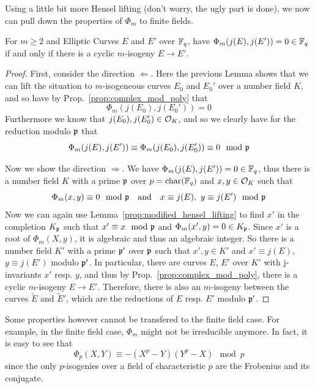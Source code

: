 Using a little bit more Hensel lifting (don't worry, the ugly part is done), we now can pull down the properties of $\Phi_m$ to finite fields.
\begin{prop}
    For $m \geq 2$ and Elliptic Curves $E$ and $E'$ over $\mathbb{F}_q$, have $\Phi_m(j(E), j(E')) = 0 \in \mathbb{F}_q$ if and only if there is a cyclic $m$-isogeny $E \to E'$.
\end{prop}
\begin{proof}
    First, consider the direction $\Leftarrow$.
    Here the previous Lemma shows that we can lift the situation to $m$-isogeneous curves $E_0$ and $E_0'$ over a number field $K$, and so have by Prop.~\ref{prop:complex_mod_poly} that
    \begin{equation*}
        \Phi_m(j(E_0), j(E_0')) = 0
    \end{equation*}
    Furthermore we know that $j(E_0), j(E_0') \in \mathcal{O}_K$, and so we clearly have for the reduction modulo $\mathfrak{p}$ that
    \begin{equation*}
        \Phi_m(j(E), j(E')) \equiv \Phi_m(j(E_0), j(E_0')) \equiv 0 \mod {\mathfrak{p}}
    \end{equation*}

    Now we show the direction $\Rightarrow$.
    We have $\Phi_m(j(E), j(E')) = 0 \in \mathbb{F}_q$, thus there is a number field $K$ with a prime $\mathfrak{p}$ over $p = \mathrm{char}(\mathbb{F}_q)$ and $x, y \in \mathcal{O}_K$ such that
    \begin{equation*}
        \Phi_m(x, y) \equiv 0 \mod {\mathfrak{p}} \quad \text{and} \quad x \equiv j(E), \ y \equiv j(E') \mod {\mathfrak{p}}
    \end{equation*}
    Now we can again use Lemma~\ref{prop:modified_hensel_lifting} to find $x'$ in the completion $K_{\mathfrak{p}}$ such that $x' \equiv x \mod {\mathfrak{p}}$ and $\Phi_m(x', y) = 0 \in K_{\mathfrak{p}}$.
    Since $x'$ is a root of $\Phi_m(X, y)$, it is algebraic and thus an algebraic integer.
    So there is a number field $K'$ with a prime $\mathfrak{p}'$ over $\mathfrak{p}$ such that $x', y \in K'$ and $x' \equiv j(E)$, $y \equiv j(E')$ modulo $\mathfrak{p}'$.
    In particular, there are curves $E$, $E'$ over $K'$ with j-invariants $x'$ resp. $y$, and thus by Prop.~\ref{prop:complex_mod_poly}, there is a cyclic $m$-isogeny $E \to E'$.
    Therefore, there is also an $m$-isogeny between the curves $\tilde{E}$ and $\tilde{E}'$, which are the reductions of $E$ resp. $E'$ modulo $\mathfrak{p}'$.
\end{proof}
Some properties however cannot be transfered to the finite field case.
For example, in the finite field case, $\Phi_m$ might not be irreducible anymore.
In fact, it is easy to see that
\begin{equation*}
    \Phi_p(X, Y) \equiv -(X^p - Y)(Y^p - X) \mod p
\end{equation*}
since the only $p$-isogenies over a field of characteristic $p$ are the Frobenius and its conjugate.


